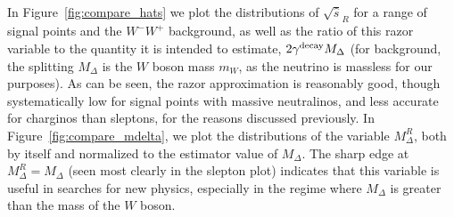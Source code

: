 
In Figure~\ref{fig:compare_hats} we plot the distributions of $\sqrt{\hat{s}}_R$ for a range of signal points and the $W^-W^+$ background, as well as the ratio of this razor variable to the quantity it is intended to estimate, $2\gamma^{\rm decay}M_\Delta$ (for background, the splitting $M_\Delta$ is the $W$ boson mass $m_W$, as the neutrino is massless for our purposes). As can be seen, the razor approximation is reasonably good, though systematically low for signal points with massive neutralinos, and less accurate for charginos than sleptons, for the reasons discussed previously. In Figure~\ref{fig:compare_mdelta}, we plot the distributions of the variable $M_\Delta^R$, both by itself and normalized to the estimator value of $M_\Delta$. The sharp edge at $M_\Delta^R = M_\Delta$ (seen most clearly in the slepton plot) indicates that this variable is useful in searches for new physics, especially in the regime where $M_\Delta$ is greater than the mass of the $W$ boson.


